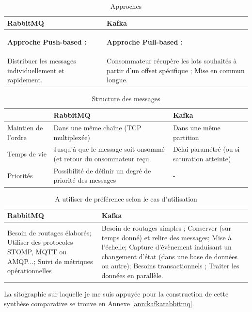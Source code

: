 \documentclass{article}
\begin{document}
			\medskip
			\begin{table}[p]
				\begin{tabular}{|p{7.5cm}|p{7.5cm}|}
				\hline
				\rowcolor{lightgray} RabbitMQ & Kafka\\\hline
				\begin{center} \textbf{Approche Push-based :}\end{center} & \begin{center} \textbf{Approche Pull-based :}\end{center}\\\hline
				Distribuer les messages individuellement et rapidement. & Consommateur récupère les lots souhaités à partir d’un offset spécifique ; Mise en commun longue.\\\hline
				\end{tabular}
				\caption{Approches}
				\label{tab:comparatifapp}
			\end{table}
			\medskip
			\begin{table}[p]
				\begin{tabular}{|p{3cm}|p{6cm}|p{6cm}|}
					\hline
					\rowcolor{lightgray} & RabbitMQ & Kafka\\\hline
					Maintien de l'ordre & Dans une même chaîne (TCP multiplexée) & Dans une même partition\\\hline
					Temps de vie & Jusqu’à que le message soit onsommé (et retour du onsommateur reçu & Délai paramétré (ou si saturation atteinte)\\\hline
					Priorités & Possibilité de définir un degré de priorité des messages & - \\\hline
				\end{tabular}
				\caption{Structure des messages}
				\label{tab:comparatifmess}
			\end{table}
			\medskip
			\begin{table}[p]
				\begin{tabular}{|p{7.5cm}|p{7.5cm}|}
				\hline
				\rowcolor{lightgray} RabbitMQ & Kafka\\\hline
				Besoin de routages élaborés; Utiliser des protocoles STOMP, MQTT ou AMQP...; Suivi de métriques opérationnelles & Besoin de routages simples ; Conserver (sur temps donné) et relire des messages; Mise à l’échelle; Capture d’évènement induisant un changement d’état (dans une base de données ou autre); Besoins transactionnels ; Traiter les données en parallèle.\\\hline
				\end{tabular}
				\caption{A utiliser de préférence selon le cas d'utilisation}
				\label{tab:comparatifpref}
			\end{table}
			La sitographie sur laquelle je me suis appuyée pour la construction de cette synthèse comparative se trouve en Annexe \ref{ann:kafkarabbitmq}.
\end{document}
